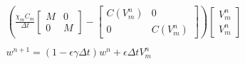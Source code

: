 \documentclass[a4paper]{article}
\theoremstyle{definition}
\begin{document}
\begin{equation}
\begin{gathered}
	\left(\frac{\chi_mC_m}{\Delta t}\begin{bmatrix} M & 0 \\ 0 & M \end{bmatrix}
	- \begin{bmatrix} C(V_m^n) & 0 \\ 0 & C(V_m^n)\end{bmatrix} 
	\right) \begin{bmatrix} V_m^n \\ V_m^n \end {bmatrix}
	 \\ \\
	w^{n+1} = (1-\epsilon \gamma \Delta t) w^n + \epsilon \Delta tV_m^n
\end{gathered}
\end{equation}
\end{document}
